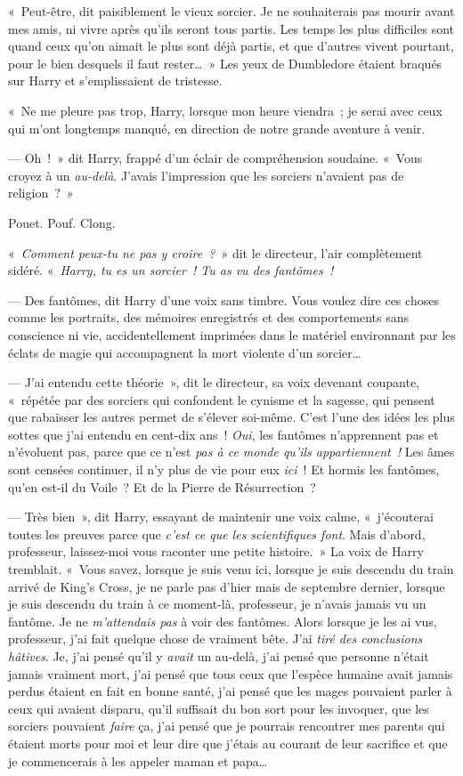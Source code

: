 «~Peut-être, dit paisiblement le vieux sorcier. Je ne souhaiterais pas mourir avant mes amis, ni vivre après qu'ils seront tous partis. Les temps les plus difficiles sont quand ceux qu'on aimait le plus sont déjà partis, et que d'autres vivent pourtant, pour le bien desquels il faut rester…~» Les yeux de Dumbledore étaient braqués sur Harry et s'emplissaient de tristesse.

«~Ne me pleure pas trop, Harry, lorsque mon heure viendra~; je serai avec ceux qui m'ont longtemps manqué, en direction de notre grande aventure à venir.

--- Oh~!~» dit Harry, frappé d'un éclair de compréhension soudaine. «~Vous croyez à un \emph{au-delà}. J'avais l'impression que les sorciers n'avaient pas de religion~?~»

\later

Pouet. Pouf. Clong.

«~\emph{Comment peux-tu ne pas y croire~?}~» dit le directeur, l'air complètement sidéré. «~\emph{Harry, tu es un sorcier~! Tu as vu des fantômes~!}

--- Des fantômes, dit Harry d'une voix sans timbre. Vous voulez dire ces choses comme les portraits, des mémoires enregistrés et des comportements sans conscience ni vie, accidentellement imprimées dans le matériel environnant par les éclats de magie qui accompagnent la mort violente d'un sorcier…

--- J'ai entendu cette théorie~», dit le directeur, sa voix devenant coupante, «~répétée par des sorciers qui confondent le cynisme et la sagesse, qui pensent que rabaisser les autres permet de s'élever soi-même. C'est l'une des idées les plus sottes que j'ai entendu en cent-dix ans~! \emph{Oui}, les fantômes n'apprennent pas et n'évoluent pas, parce que ce n'est \emph{pas à ce monde qu'ils appartiennent~!} Les âmes sont censées continuer, il n'y plus de vie pour eux \emph{ici}~! Et hormis les fantômes, qu'en est-il du Voile~? Et de la Pierre de Résurrection~?

--- Très bien~», dit Harry, essayant de maintenir une voix calme, «~j'écouterai toutes les preuves parce que \emph{c'est ce que les scientifiques font}. Mais d'abord, professeur, laissez-moi vous raconter une petite histoire.~» La voix de Harry tremblait. «~Vous savez, lorsque je suis venu ici, lorsque je suis descendu du train arrivé de King's Cross, je ne parle pas d'hier mais de septembre dernier, lorsque je suis descendu du train à ce moment-là, professeur, je n'avais jamais vu un fantôme. Je ne \emph{m'attendais pas} à voir des fantômes. Alors lorsque je les ai vus, professeur, j'ai fait quelque chose de vraiment bête. J'ai \emph{tiré des conclusions hâtives}. Je, j'ai pensé qu'il y \emph{avait} un au-delà, j'ai pensé que personne n'était jamais vraiment mort, j'ai pensé que tous ceux que l'espèce humaine avait jamais perdus étaient en fait en bonne santé, j'ai pensé que les mages pouvaient parler à ceux qui avaient disparu, qu'il suffisait du bon sort pour les invoquer, que les sorciers pouvaient \emph{faire} ça, j'ai pensé que je pourrais rencontrer mes parents qui étaient morts pour moi et leur dire que j'étais au courant de leur sacrifice et que je commencerais à les appeler maman et papa…

